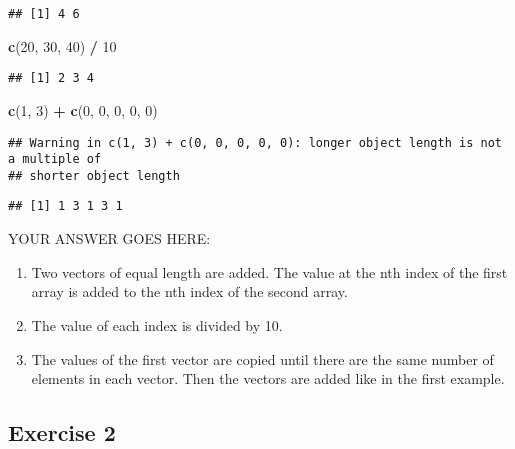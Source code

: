 \documentclass[
]{article}
\newenvironment{Shaded}{\begin{snugshade}}{\end{snugshade}}
\newcommand{\DecValTok}[1]{\textcolor[rgb]{0.00,0.00,0.81}{#1}}
\newcommand{\KeywordTok}[1]{\textcolor[rgb]{0.13,0.29,0.53}{\textbf{#1}}}
\newcommand{\NormalTok}[1]{#1}
\newcommand{\OperatorTok}[1]{\textcolor[rgb]{0.81,0.36,0.00}{\textbf{#1}}}
\newcommand{\StringTok}[1]{\textcolor[rgb]{0.31,0.60,0.02}{#1}}
\providecommand{\tightlist}{%
  \setlength{\itemsep}{0pt}\setlength{\parskip}{0pt}}
\begin{document}
\begin{verbatim}
## [1] 4 6
\end{verbatim}

\begin{Shaded}
\begin{Highlighting}[]
\KeywordTok{c}\NormalTok{(}\DecValTok{20}\NormalTok{, }\DecValTok{30}\NormalTok{, }\DecValTok{40}\NormalTok{) }\OperatorTok{/}\StringTok{ }\DecValTok{10}
\end{Highlighting}
\end{Shaded}

\begin{verbatim}
## [1] 2 3 4
\end{verbatim}

\begin{Shaded}
\begin{Highlighting}[]
\KeywordTok{c}\NormalTok{(}\DecValTok{1}\NormalTok{, }\DecValTok{3}\NormalTok{) }\OperatorTok{+}\StringTok{ }\KeywordTok{c}\NormalTok{(}\DecValTok{0}\NormalTok{, }\DecValTok{0}\NormalTok{, }\DecValTok{0}\NormalTok{, }\DecValTok{0}\NormalTok{, }\DecValTok{0}\NormalTok{)}
\end{Highlighting}
\end{Shaded}

\begin{verbatim}
## Warning in c(1, 3) + c(0, 0, 0, 0, 0): longer object length is not a multiple of
## shorter object length
\end{verbatim}

\begin{verbatim}
## [1] 1 3 1 3 1
\end{verbatim}

YOUR ANSWER GOES HERE:

\begin{enumerate}
\def\labelenumi{\arabic{enumi}.}
\tightlist
\item
  Two vectors of equal length are added. The value at the nth index of
  the first array is added to the nth index of the second array.
\item
  The value of each index is divided by 10.
\item
  The values of the first vector are copied until there are the same
  number of elements in each vector. Then the vectors are added like in
  the first example.
\end{enumerate}

\hypertarget{exercise-2}{%
\subsection{Exercise 2}\label{exercise-2}}
\end{document}
